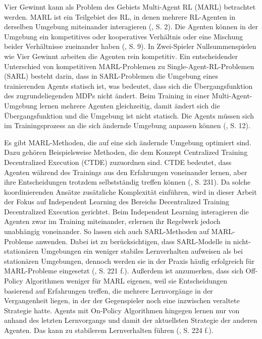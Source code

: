 Vier Gewinnt kann als Problem des Gebiets Multi-Agent RL (MARL) betrachtet werden. MARL ist ein Teilgebiet des RL, in denen mehrere RL-Agenten in derselben Umgebung miteinander interagieren (\cite{Albrecht.2024}, S. 2). Die Agenten können in der Umgebung ein kompetitives oder kooperatives Verhältnis oder eine Mischung beider Verhältnisse zueinander haben (\cite{Albrecht.2024}, S. 9). In Zwei-Spieler Nullsummenspielen wie Vier Gewinnt arbeiten die Agenten rein kompetitiv. Ein entscheidender Unterschied von kompetitiven MARL-Problemen zu Single-Agent-RL-Problemen (SARL) besteht darin, dass in SARL-Problemen die Umgebung eines trainierenden Agents statisch ist, was bedeutet, dass sich die Übergangsfunktion des zugrundeliegenden MDPs nicht ändert. Beim Training in einer Multi-Agent-Umgebung lernen mehrere Agenten gleichzeitig, damit ändert sich die Übergangsfunktion und die Umgebung ist nicht statisch. Die Agents müssen sich im Trainingsprozess an die sich ändernde Umgebung anpassen können (\cite{Albrecht.2024}, S. 12).

Es gibt MARL-Methoden, die auf eine sich ändernde Umgebung optimiert sind. Dazu gehören Beispielsweise Methoden, die dem Konzept \glqq Centralized Training Decentralized Execution\grqq{} (CTDE) zuzuordnen sind. CTDE bedeutet, dass Agenten während des Trainings aus den Erfahrungen voneinander lernen, aber ihre Entscheidungen trotzdem selbstständig treffen können (\cite{Albrecht.2024}, S. 231). Da solche koordinierenden Ansätze zusätzliche Komplexität einführen, wird in dieser Arbeit der Fokus auf Independent Learning des Bereichs \glqq Decentralized Training Decentralized Execution\grqq{} gerichtet. Beim Independent Learning interagieren die Agenten zwar im Training miteinander, erlernen ihr Regelwerk jedoch unabhängig voneinander. So lassen sich auch SARL-Methoden auf MARL-Probleme anwenden. Dabei ist zu berücksichtigen, dass SARL-Modelle in nicht-stationären Umgebungen ein weniger stabiles Lernverhalten aufweisen als bei stationären Umgebungen, dennoch werden sie in der Praxis häufig erfolgreich für MARL-Probleme eingesetzt (\cite{Albrecht.2024}, S. 221 f.). Außerdem ist anzumerken, dass sich Off-Policy Algorithmen weniger für MARL eigenen, weil sie Entscheidungen basierend auf Erfahrungen treffen, die mehrere Lernvorgänge in der Vergangenheit liegen, in der der Gegenspieler noch eine inzwischen veraltete Strategie hatte. Agents mit On-Policy Algorithmen hingegen lernen nur von anhand des letzten Lernvorgangs und damit der aktuellsten Strategie der anderen Agenten. Das kann zu stabilerem Lernverhalten führen (\cite{Albrecht.2024}, S. 224 f.).